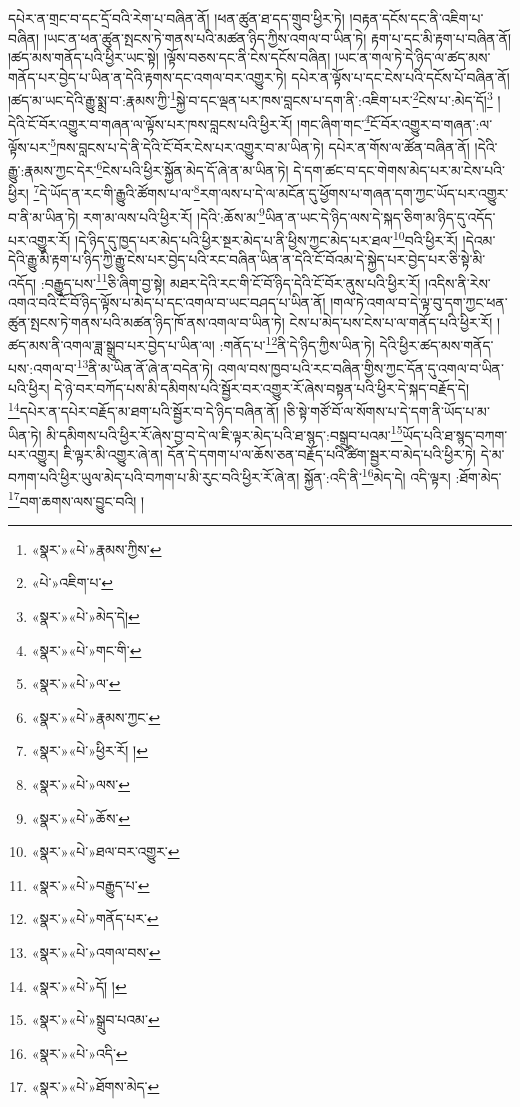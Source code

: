 དཔེར་ན་གྲང་བ་དང་དྲོ་བའི་རེག་པ་བཞིན་ནོ། །ཕན་ཚུན་ཐ་དད་གྲུབ་ཕྱིར་ཏེ། །བརྟན་དངོས་དང་ནི་འཇིག་པ་བཞིན། །ཡང་ན་ཕན་ཚུན་སྤངས་ཏེ་གནས་པའི་མཚན་ཉིད་ཀྱིས་འགལ་བ་ཡིན་ཏེ། རྟག་པ་དང་མི་རྟག་པ་བཞིན་ནོ། །ཚད་མས་གནོད་པའི་ཕྱིར་ཡང་སྟེ། །ལྟོས་བཅས་དང་ནི་ངེས་དངོས་བཞིན། །ཡང་ན་གལ་ཏེ་དེ་ཉིད་ལ་ཚད་མས་གནོད་པར་བྱེད་པ་ཡིན་ན་དེའི་རྟགས་དང་འགལ་བར་འགྱུར་ཏེ། དཔེར་ན་ལྟོས་པ་དང་ངེས་པའི་དངོས་པོ་བཞིན་ནོ། །ཚད་མ་ཡང་དེའི་རྒྱུ་སྨྲ་བ་:རྣམས་ཀྱི་\footnote{«སྣར་»«པེ་»རྣམས་ཀྱིས་}སྐྱེ་བ་དང་ལྡན་པར་ཁས་བླངས་པ་དག་ནི་:འཇིག་པར་\footnote{«པེ་»འཇིག་པ་}ངེས་པ་:མེད་དོ།\footnote{«སྣར་»«པེ་»མེད་དེ།} །དེའི་ངོ་བོར་འགྱུར་བ་གཞན་ལ་ལྟོས་པར་ཁས་བླངས་པའི་ཕྱིར་རོ། །གང་ཞིག་གང་\footnote{«སྣར་»«པེ་»གང་གི་}ངོ་བོར་འགྱུར་བ་གཞན་:ལ་ལྟོས་པར་\footnote{«སྣར་»«པེ་»ལ་}ཁས་བླངས་པ་དེ་ནི་དེའི་ངོ་བོར་ངེས་པར་འགྱུར་བ་མ་ཡིན་ཏེ། དཔེར་ན་གོས་ལ་ཚོན་བཞིན་ནོ། །དེའི་རྒྱུ་:རྣམས་ཀྱང་དེར་\footnote{«སྣར་»«པེ་»རྣམས་ཀྱང་}ངེས་པའི་ཕྱིར་སྐྱོན་མེད་དོ་ཞེ་ན་མ་ཡིན་ཏེ། དེ་དག་ཚང་བ་དང་གེགས་མེད་པར་མ་ངེས་པའི་ཕྱིར། \footnote{«སྣར་»«པེ་»ཕྱིར་རོ། ། }དེ་ཡོད་ན་རང་གི་རྒྱུའི་ཚོགས་པ་ལ་\footnote{«སྣར་»«པེ་»ལས་}རག་ལས་པ་དེ་ལ་མངོན་དུ་ཕྱོགས་པ་གཞན་དག་ཀྱང་ཡོད་པར་འགྱུར་བ་ནི་མ་ཡིན་ཏེ། རག་མ་ལས་པའི་ཕྱིར་རོ། །དེའི་:ཆོས་མ་\footnote{«སྣར་»«པེ་»ཆོས་}ཡིན་ན་ཡང་དེ་ཉིད་ལས་དེ་སྐད་ཅིག་མ་ཉིད་དུ་འདོད་པར་འགྱུར་རོ། །དེ་ཉིད་དུ་ཁྱད་པར་མེད་པའི་ཕྱིར་སྔར་མེད་པ་ནི་ཕྱིས་ཀྱང་མེད་པར་ཐལ་\footnote{«སྣར་»«པེ་»ཐལ་བར་འགྱུར་}བའི་ཕྱིར་རོ། །དེའམ་དེའི་རྒྱུ་མི་རྟག་པ་ཉིད་ཀྱི་རྒྱུ་ངེས་པར་བྱེད་པའི་རང་བཞིན་ཡིན་ན་དེའི་ངོ་བོའམ་དེ་སྐྱེད་པར་བྱེད་པར་ཅི་སྟེ་མི་འདོད། :བརྒྱུད་པས་\footnote{«སྣར་»«པེ་»བརྒྱུད་པ་}ཅི་ཞིག་བྱ་སྟེ། མཐར་དེའི་རང་གི་ངོ་བོ་ཉིད་དེའི་ངོ་བོར་ནུས་པའི་ཕྱིར་རོ། །འདིས་ནི་རེས་འགའ་བའི་ངོ་བོ་ཉིད་ལྟོས་པ་མེད་པ་དང་འགལ་བ་ཡང་བཤད་པ་ཡིན་ནོ། །གལ་ཏེ་འགལ་བ་དེ་ལྟ་བུ་དག་ཀྱང་ཕན་ཚུན་སྤངས་ཏེ་གནས་པའི་མཚན་ཉིད་ཁོ་ནས་འགལ་བ་ཡིན་ཏེ། ངེས་པ་མེད་པས་ངེས་པ་ལ་གནོད་པའི་ཕྱིར་རོ། །ཚད་མས་ནི་འགལ་ཟླ་སྒྲུབ་པར་བྱེད་པ་ཡིན་ལ། :གནོད་པ་\footnote{«སྣར་»«པེ་»གནོད་པར་}ནི་དེ་ཉིད་ཀྱིས་ཡིན་ཏེ། དེའི་ཕྱིར་ཚད་མས་གནོད་པས་:འགལ་བ་\footnote{«སྣར་»«པེ་»འགལ་བས་}ནི་མ་ཡིན་ནོ་ཞེ་ན་བདེན་ཏེ། འགལ་བས་ཁྱབ་པའི་རང་བཞིན་གྱིས་ཀྱང་དོན་དུ་འགལ་བ་ཡིན་པའི་ཕྱིར། དེ་ཉེ་བར་བཀོད་པས་མི་དམིགས་པའི་སྦྱོར་བར་འགྱུར་རོ་ཞེས་བསྟན་པའི་ཕྱིར་དེ་སྐད་བརྗོད་དེ། \footnote{«སྣར་»«པེ་»དོ། ། }དཔེར་ན་དཔེར་བརྗོད་མ་ཐག་པའི་སྦྱོར་བ་དེ་ཉིད་བཞིན་ནོ། །ཅི་སྟེ་གཙོ་བོ་ལ་སོགས་པ་དེ་དག་ནི་ཡོད་པ་མ་ཡིན་ཏེ། མི་དམིགས་པའི་ཕྱིར་རོ་ཞེས་བྱ་བ་དེ་ལ་ཇི་ལྟར་མེད་པའི་ཐ་སྙད་:བསྒྲུབ་པའམ་\footnote{«སྣར་»«པེ་»སྒྲུབ་པའམ་}ཡོད་པའི་ཐ་སྙད་བཀག་པར་འགྱུར། ཇི་ལྟར་མི་འགྱུར་ཞེ་ན། དོན་དེ་དགག་པ་ལ་ཆོས་ཅན་བརྗོད་པའི་ཚིག་སྦྱར་བ་མེད་པའི་ཕྱིར་ཏེ། དེ་མ་བཀག་པའི་ཕྱིར་ཡུལ་མེད་པའི་བཀག་པ་མི་རུང་བའི་ཕྱིར་རོ་ཞེ་ན། སྐྱོན་:འདི་ནི་\footnote{«སྣར་»«པེ་»འདི་}མེད་དེ། འདི་ལྟར། :ཐོག་མེད་\footnote{«སྣར་»«པེ་»ཐོགས་མེད་}བག་ཆགས་ལས་བྱུང་བའི། །
